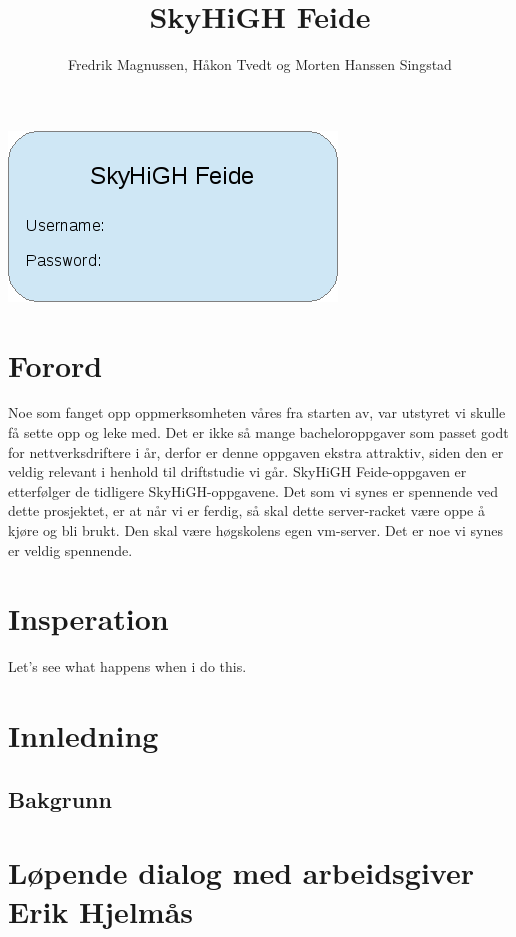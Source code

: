 \documentclass[12pt,a4paper]{article}
\begin{document}
\title{SkyHiGH Feide}
\author{Fredrik Magnussen, Håkon Tvedt og Morten Hanssen Singstad}
\maketitle 
\begin{center}
\includegraphics[scale=1]{frontpageimage.png}
\end{center}

\newpage
\tableofcontents


\newpage
\section{Forord}
Noe som fanget opp oppmerksomheten våres fra starten av, var utstyret vi skulle få sette opp og leke med. Det er ikke så mange bacheloroppgaver som passet godt for nettverksdriftere i år, derfor er denne oppgaven ekstra attraktiv, siden den er veldig relevant i henhold til driftstudie vi går. SkyHiGH Feide-oppgaven er etterfølger de tidligere SkyHiGH-oppgavene. Det som vi synes er spennende ved dette prosjektet, er at når vi er ferdig, så skal dette server-racket være oppe å kjøre og bli brukt. Den skal være høgskolens egen vm-server. Det er noe vi synes er veldig spennende.

\section{Insperation}
Let's see what happens when i do this.

\newpage
\section{Innledning}
\subsection{Bakgrunn}

\newpage
\section{Løpende dialog med arbeidsgiver Erik Hjelmås}
\end{document}
